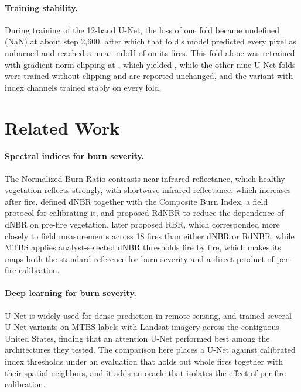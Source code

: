\documentclass[10pt]{article}
\begin{document}
\paragraph{Training stability.}
During training of the 12-band U-Net, the loss of one fold became undefined (NaN) at about step 2{,}600, after which that fold's model predicted every pixel as unburned and reached a mean mIoU of \mBandsFoldFourBefore{} on its fires.
This fold alone was retrained with gradient-norm clipping at \mBandsClip, which yielded \mBandsFoldFourAfter, while the other nine U-Net folds were trained without clipping and are reported unchanged, and the variant with index channels trained stably on every fold.

\section{Related Work}
\label{sec:related}

\paragraph{Spectral indices for burn severity.}
The Normalized Burn Ratio contrasts near-infrared reflectance, which healthy vegetation reflects strongly, with shortwave-infrared reflectance, which increases after fire.
\citet{key2006landscape} defined dNBR together with the Composite Burn Index, a field protocol for calibrating it, and \citet{miller2007rdnbr} proposed RdNBR to reduce the dependence of dNBR on pre-fire vegetation.
\citet{parks2014rbr} later proposed RBR, which corresponded more closely to field measurements across 18 fires than either dNBR or RdNBR, while MTBS \citep{eidenshink2007mtbs} applies analyst-selected dNBR thresholds fire by fire, which makes its maps both the standard reference for burn severity and a direct product of per-fire calibration.

\paragraph{Deep learning for burn severity.}
U-Net \citep{ronneberger2015unet} is widely used for dense prediction in remote sensing, and \citet{hu2023burnseverity} trained several U-Net variants on MTBS labels with Landsat imagery across the contiguous United States, finding that an attention U-Net performed best among the architectures they tested.
The comparison here places a U-Net against calibrated index thresholds under an evaluation that holds out whole fires together with their spatial neighbors, and it adds an oracle that isolates the effect of per-fire calibration.
\end{document}
